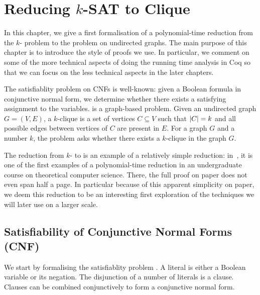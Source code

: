 \newcommand{\varBound}{\textsf{varBound}}
\newcommand{\maxVar}{\textsf{maxVar}}

\chapter{Reducing $k$-SAT to Clique}\label{chap:ksat_clique}
In this chapter, we give a first formalisation of a polynomial-time reduction from the $k$-\SAT{} problem to the \Clique{} problem on undirected graphs. The main purpose of this chapter is to introduce the style of proofs we use. In particular, we comment on some of the more technical aspects of doing the running time analysis in Coq so that we can focus on the less technical aspects in the later chapters. 

The satisfiablity problem \SAT{} on CNFs is well-known: given a Boolean formula in conjunctive normal form, we determine whether there exists a satisfying assignment to the variables. 
\Clique{} is a graph-based problem. Given an undirected graph $G = (V, E)$, a $k$-clique is a set of vertices $C \subseteq V$ such that $|C| = k$ and all possible edges between vertices of $C$ are present in $E$. For a graph $G$ and a number $k$, the \Clique{} problem asks whether there exists a $k$-clique in the graph $G$. 

The reduction from $k$-\SAT{} to \Clique{} is an example of a relatively simple reduction: in~\cite{Bläser:TISkript}, it is one of the first examples of a polynomial-time reduction in an undergraduate course on theoretical computer science. There, the full proof on paper does not even span half a page. 
In particular because of this apparent simplicity on paper, we deem this reduction to be an interesting first exploration of the techniques we will later use on a larger scale.

\section{Satisfiability of Conjunctive Normal Forms (CNF)}\label{sec:sat}
We start by formalising the satisfiablity problem \SAT{}.
A literal is either a Boolean variable or its negation. The disjunction of a number of literals is a clause. Clauses can be combined conjunctively to form a conjunctive normal form. 

